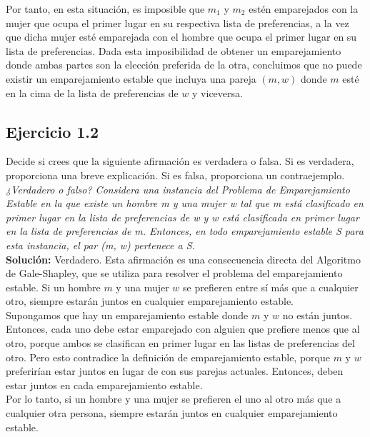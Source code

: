 \documentclass{article}
\begin{document}
Por tanto, en esta situación, es imposible que $m_1$ y $m_2$ estén emparejados con la mujer que ocupa el primer lugar en su respectiva lista de preferencias, a la vez que dicha mujer esté emparejada con el hombre que ocupa el primer lugar en su lista de preferencias. Dada esta imposibilidad de obtener un emparejamiento donde ambas partes son la elección preferida de la otra, concluimos que no puede existir un emparejamiento estable que incluya una pareja $(m, w)$ donde $m$ esté en la cima de la lista de preferencias de $w$ y viceversa.

\newpage

\subsection{Ejercicio 1.2}
Decide si crees que la siguiente afirmación es verdadera o falsa. Si es verdadera, proporciona una breve explicación. Si es falsa, proporciona un contraejemplo.\\

\emph{¿Verdadero o falso? Considera una instancia del Problema de Emparejamiento Estable en la que existe un hombre m y una mujer w tal que m está clasificado en primer lugar en la lista de preferencias de w y w está clasificada en primer lugar en la lista de preferencias de m. Entonces, en todo emparejamiento estable S para esta instancia, el par (m, w) pertenece a S.}\\

\textbf{Solución:} Verdadero. Esta afirmación es una consecuencia directa del Algoritmo de Gale-Shapley, que se utiliza para resolver el problema del emparejamiento estable. Si un hombre $m$ y una mujer $w$ se prefieren entre sí más que a cualquier otro, siempre estarán juntos en cualquier emparejamiento estable.\\

Supongamos que hay un emparejamiento estable donde $m$ y $w$ no están juntos. Entonces, cada uno debe estar emparejado con alguien que prefiere menos que al otro, porque ambos se clasifican en primer lugar en las listas de preferencias del otro. Pero esto contradice la definición de emparejamiento estable, porque $m$ y $w$ preferirían estar juntos en lugar de con sus parejas actuales. Entonces, deben estar juntos en cada emparejamiento estable.\\

Por lo tanto, si un hombre y una mujer se prefieren el uno al otro más que a cualquier otra persona, siempre estarán juntos en cualquier emparejamiento estable.
\end{document}
